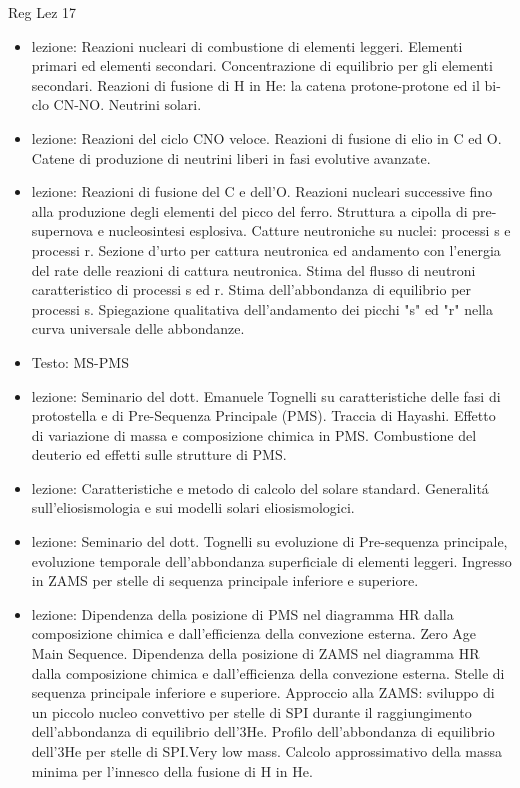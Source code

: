 \begin{frame}[allowframebreaks]{Reg Lez 17}
\begin{itemize}
\item lezione: Reazioni nucleari di combustione di elementi leggeri. Elementi primari ed elementi secondari. Concentrazione di equilibrio per gli elementi secondari. Reazioni di fusione di H in He: la catena protone-protone ed il bi-clo CN-NO. Neutrini solari.
\item lezione: Reazioni del ciclo CNO veloce. Reazioni di fusione di elio in C ed O. Catene di produzione di neutrini liberi in fasi evolutive avanzate.
\item lezione: Reazioni di fusione del C e dell'O. Reazioni nucleari successive fino alla produzione degli elementi del picco del ferro. Struttura a cipolla di pre-supernova e nucleosintesi esplosiva. Catture neutroniche su nuclei: processi s e processi r. Sezione d'urto per cattura neutronica ed andamento con l'energia del rate delle reazioni di cattura neutronica. Stima del flusso di neutroni caratteristico di processi s ed r. Stima dell'abbondanza di equilibrio per processi s. Spiegazione qualitativa dell'andamento dei picchi "s" ed "r" nella curva universale delle abbondanze.
\item Testo: MS-PMS
\item lezione: Seminario del dott. Emanuele Tognelli su caratteristiche delle fasi di protostella e di Pre-Sequenza Principale (PMS). Traccia di Hayashi. Effetto di variazione di massa e composizione chimica in PMS. Combustione del deuterio ed effetti sulle strutture di PMS.
\item lezione: Caratteristiche e metodo di calcolo del solare standard. Generalit\'a sull'eliosismologia e sui modelli solari eliosismologici.
\item lezione: Seminario del dott. Tognelli su evoluzione di Pre-sequenza principale, evoluzione temporale dell'abbondanza superficiale di elementi leggeri. Ingresso in ZAMS per stelle di sequenza principale inferiore e superiore.
\item lezione: Dipendenza della posizione di PMS nel diagramma HR dalla composizione chimica e dall'efficienza della convezione esterna. Zero Age Main Sequence. Dipendenza della posizione di ZAMS nel diagramma HR dalla composizione chimica e dall'efficienza della convezione esterna. Stelle di sequenza principale inferiore e superiore. Approccio alla ZAMS: sviluppo di un piccolo nucleo convettivo per stelle di SPI durante il raggiungimento dell'abbondanza di equilibrio dell'3He. Profilo dell'abbondanza di equilibrio dell'3He per stelle di SPI.Very low mass. Calcolo approssimativo della massa minima per l'innesco della fusione di H in He. 

\end{itemize}
\end{frame}
